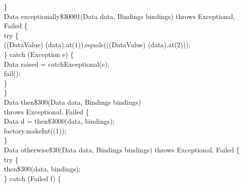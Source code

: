 \begin{flushleft}
\hspace*{4\indentation}\}\mbox{}\\
\hspace*{4\indentation}{\bf private} Data exceptionally\$30001(Data data, Bindings bindings) throws Exceptional, Failed \{\mbox{}\\
\hspace*{8\indentation}try \{\mbox{}\\
\hspace*{12\indentation}{\bf return} ((DataValue) (data).at(1)).equals(((DataValue) (data).at(2)));\mbox{}\\
\hspace*{8\indentation}\} catch (Exception e) \{\mbox{}\\
\hspace*{12\indentation}Data raised = catchExceptional(e);\mbox{}\\
\hspace*{12\indentation}{\bf return} fail();\mbox{}\\
\hspace*{8\indentation}\}\mbox{}\\
\hspace*{4\indentation}\}\mbox{}\\
\hspace*{4\indentation}{\bf private} Data then\$300(Data data,  Bindings bindings)\mbox{}\\
\hspace*{8\indentation}throws Exceptional, Failed \{\mbox{}\\
\hspace*{8\indentation}Data d = then\$3000(data, bindings);\mbox{}\\
\hspace*{8\indentation}{\bf return} factory.makeInt((1));\mbox{}\\
\hspace*{4\indentation}\}\mbox{}\\
\hspace*{4\indentation}{\bf private} Data otherwise\$30(Data data, Bindings bindings) throws Exceptional, Failed \{\mbox{}\\
\hspace*{8\indentation}try \{\mbox{}\\
\hspace*{12\indentation}{\bf return} then\$300(data, bindings);\mbox{}\\
\hspace*{8\indentation}\} catch (Failed f) \{\mbox{}\\

\end{flushleft}

